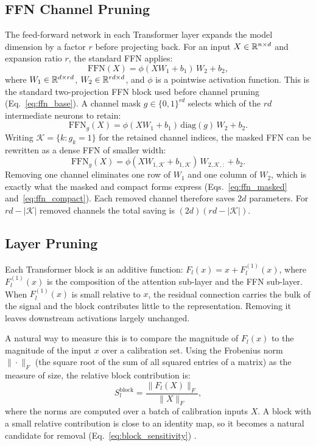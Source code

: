 \subsection{FFN Channel Pruning}
\label{subsec:ffn_channel_pruning}

The feed-forward network in each Transformer layer expands the model dimension
by a factor $r$ before projecting back. For an input $X \in \mathbb{R}^{n \times d}$
and expansion ratio $r$, the standard FFN applies:
\begin{equation}
	\mathrm{FFN}(X) = \phi(X W_1 + b_1)\,W_2 + b_2,
	\label{eq:ffn_base}
\end{equation}
where $W_1 \in \mathbb{R}^{d \times rd}$, $W_2 \in \mathbb{R}^{rd \times d}$, and $\phi$ is
a pointwise activation function. This is the standard two-projection FFN block used before channel pruning (Eq.~\eqref{eq:ffn_base}). A channel mask
$g \in \{0,1\}^{rd}$ selects which of the $rd$ intermediate neurons to retain:
\begin{equation}
	\mathrm{FFN}_g(X) = \phi(XW_1 + b_1)\,\mathrm{diag}(g)\,W_2 + b_2.
	\label{eq:ffn_masked}
\end{equation}
Writing $\mathcal{K} = \{k : g_k = 1\}$ for the retained channel indices,
the masked FFN can be rewritten as a dense FFN of smaller width:
\begin{equation}
	\mathrm{FFN}_g(X) = \phi(X W_{1,\mathcal{K}} + b_{1,\mathcal{K}})\,
	W_{2,\mathcal{K},:} + b_2.
	\label{eq:ffn_compact}
\end{equation}
Removing one channel eliminates one row of $W_1$ and one column of $W_2$,
which is exactly what the masked and compact forms express (Eqs.~\eqref{eq:ffn_masked} and~\eqref{eq:ffn_compact}). Each removed channel therefore saves $2d$ parameters. For
$rd - |\mathcal{K}|$ removed channels the total saving is
$(2d)(rd - |\mathcal{K}|)$.

\subsection{Layer Pruning}
\label{subsec:layer_pruning}

Each Transformer block is an additive function: $F_l(x) = x + F_l^{(1)}(x)$,
where $F_l^{(1)}(x)$ is the composition of the attention sub-layer and the
FFN sub-layer. When $F_l^{(1)}(x)$ is small relative to $x$, the residual
connection carries the bulk of the signal and the block contributes little to
the representation. Removing it leaves downstream activations largely
unchanged.

A natural way to measure this is to compare the magnitude of $F_l(x)$ to the
magnitude of the input $x$ over a calibration set. Using the Frobenius norm
$\|\cdot\|_F$ (the square root of the sum of all squared entries of a matrix)
as the measure of size, the relative block contribution is:
\begin{equation}
	S_l^{\mathrm{block}} = \frac{\|F_l(X)\|_F}{\|X\|_F},
	\label{eq:block_sensitivity}
\end{equation}
where the norms are computed over a batch of calibration inputs $X$. A block
with a small relative contribution is close to an identity map, so it becomes a natural candidate for removal (Eq.~\eqref{eq:block_sensitivity}) \cite{michel2022not,kurtic2023ziplm}.

